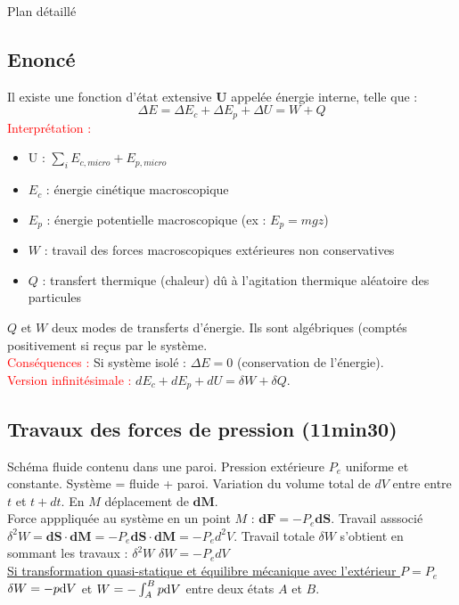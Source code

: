 \begin{reportBlock}{Plan détaillé}
  \subsection{Enoncé} Il existe une fonction d'état extensive \textbf{U} appelée énergie interne, telle que : 
  \begin{equation}
      \Delta E = \Delta E_c + \Delta E_p + \Delta U = W + Q
  \end{equation}
  \textcolor{red}{Interprétation :}
  \begin{itemize}
  \item U : $\sum_{i} E_{c,micro} + E_{p,micro}$
  \item $E_c$ : énergie cinétique macroscopique
  \item $E_p$ : énergie potentielle macroscopique (ex : $E_p=mgz$)
  \item $W$ : travail des forces macroscopiques extérieures non conservatives
  \item $Q$ : transfert thermique (chaleur) dû à l'agitation thermique aléatoire des particules
  \end{itemize}
  $Q$ et $W$ deux modes de transferts d'énergie. Ils sont algébriques (comptés positivement si reçus par le système. \\
  
  \textcolor{red}{Conséquences : } Si système isolé : $\Delta E = 0$ (conservation de l'énergie). \\
  
  \textcolor{red}{Version infinitésimale : } $dE_c + dE_p + dU = \delta W + \delta Q$.
  
  \subsection{Travaux des forces de pression (11min30)}
  Schéma fluide contenu dans une paroi. Pression extérieure $P_e$ uniforme et constante. Système = {fluide + paroi}. Variation du volume total de $dV$ entre entre $t$ et $t+dt$. En $M$ déplacement de $\mathbf{dM}$. \\
  Force apppliquée au système en un point $M$ : $\mathbf{dF}=-P_e\mathbf{dS}$. Travail asssocié $\delta^2 W = \mathbf{dS}\cdot\mathbf{dM} = -P_e \mathbf{dS}\cdot\mathbf{dM} = - P_e d^2 V$. Travail totale $\delta W$ s'obtient en sommant les travaux : $\delta^2 W$ $\delta W = -P_e dV$\\
  \underline{Si transformation quasi-statique et équilibre mécanique avec l'extérieur $P=P_e$} $\delta W = - p \mathrm{d} V$ et $W = - \int_A^B p \mathrm{d} V$ entre deux états $A$ et $B$.
  

\end{reportBlock}
